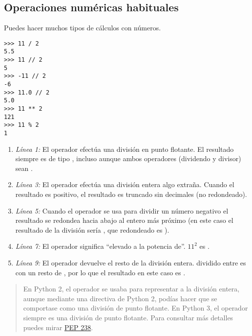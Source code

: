 \subsection{Operaciones numéricas habituales}

Puedes hacer muchos tipos de cálculos con números.

\noindent\begin{minipage}{\textwidth}
\begin{lstlisting}[mathescape=True]
>>> 11 / 2
5.5
>>> 11 // 2
5
>>> -11 // 2
-6
>>> 11.0 // 2
5.0
>>> 11 ** 2
121
>>> 11 % 2
1
\end{lstlisting}
\end{minipage}

\begin{enumerate}

\item \emph{Línea 1:} El operador \codigo{/} efectúa una división en punto flotante. El resultado siempre es de tipo , incluso aunque ambos operadores (dividendo y divisor) sean .

\item \emph{Línea 3:} El operador \codigo{//} efectúa una división entera algo extraña. Cuando el resultado es positivo, el resultado es  truncado sin decimales (no redondeado).

\item \emph{Línea 5:} Cuando el operador \codigo{//} se usa para dividir un número negativo el resultado se redondea hacia abajo al entero más próximo (en este caso el resultado de la división sería , que redondeado es ).
 
\item \emph{Línea 7:} El operador \codigo{**} significa ``elevado a la potencia de''. $11^2$ es .

\item \emph{Línea 9:} El operador \codigo{\%} devuelve el resto de la división entera.  dividido entre  es  con un resto de , por lo que el resultado en este caso es .

\end{enumerate}

\begin{quote}
En Python 2, el operador \codigo{/} se usaba para representar a la división entera, aunque mediante una directiva de Python 2, podías hacer que se comportase como una división de punto flotante. En Python 3, el operador \codigo{/} siempre es una división de punto flotante. Para consultar más detalles puedes mirar \href{http://www.python.org/dev/peps/pep-0238/}{PEP 238}.
\end{quote}

